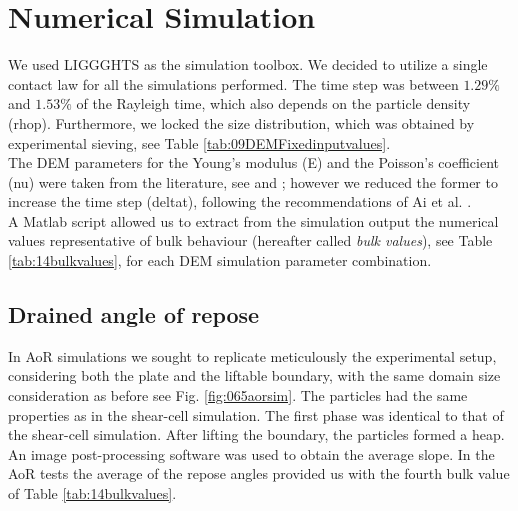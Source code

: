 
\chapter{Numerical Simulation}
\label{cap:numericalsimulation}


We used \acs{LIGGGHTS} as the simulation toolbox.
We decided to utilize a single
contact law for all the simulations performed.
The time step was between $1.29 \%$ and $1.53 \%$ of the Rayleigh time, which
also depends on the particle density (\acs{rhop}).
Furthermore, we locked the size distribution, which was obtained by experimental
sieving, see Table \ref{tab:09DEMFixedinputvalues}.\\
The \acs{DEM} parameters for the Young's modulus (\acs{E}) and the Poisson's coefficient
(\acs{nu}) were taken from the literature, see \cite{RefWorks:175} 
and \cite{RefWorks:176}; however we reduced the former to increase the time step
(\acs{deltat}), following the recommendations of Ai et al.
\cite{RefWorks:131}.\\
A Matlab script allowed us to extract from the simulation output the numerical
values representative of bulk behaviour (hereafter called \textit{bulk values}),
see Table \ref{tab:14bulkvalues},
for each \acs{DEM} simulation parameter combination.



\section{Drained angle of repose}
\label{sec:aorsim}

In \acs{AoR} simulations we sought to replicate meticulously the experimental setup, 
considering both the plate and the liftable boundary, with the same domain size consideration as before
see Fig. \ref{fig:065aorsim}. 
The particles had the same properties as in the shear-cell simulation. 
The first phase was identical to that of the shear-cell simulation. 
After lifting the boundary, the particles formed a heap.
An image post-processing software was used to obtain the average slope.
In the \acs{AoR} tests the average of the repose angles provided us with the fourth
bulk value of Table \ref{tab:14bulkvalues}.


